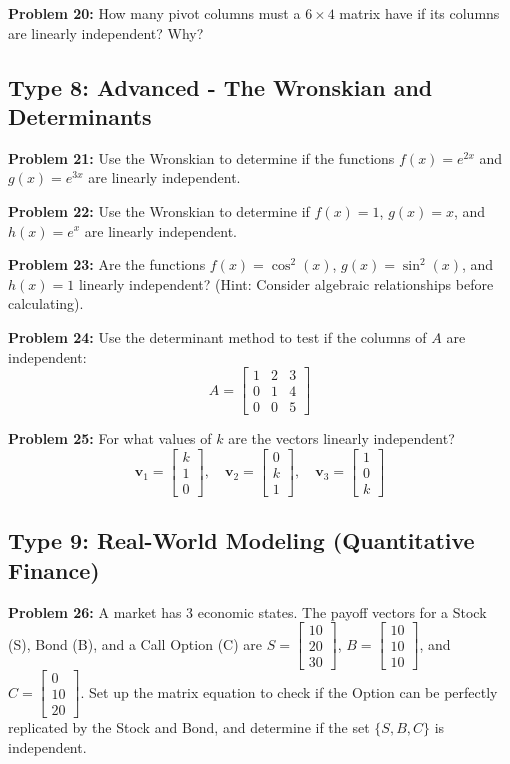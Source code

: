 \documentclass[12pt]{article}
\begin{document}
\textbf{Problem 20:} How many pivot columns must a $6 \times 4$ matrix have if its columns are linearly independent? Why?

\subsection*{Type 8: Advanced - The Wronskian and Determinants}
\textbf{Problem 21:} Use the Wronskian to determine if the functions $f(x) = e^{2x}$ and $g(x) = e^{3x}$ are linearly independent.

\textbf{Problem 22:} Use the Wronskian to determine if $f(x) = 1$, $g(x) = x$, and $h(x) = e^x$ are linearly independent.

\textbf{Problem 23:} Are the functions $f(x) = \cos^2(x)$, $g(x) = \sin^2(x)$, and $h(x) = 1$ linearly independent? (Hint: Consider algebraic relationships before calculating).

\textbf{Problem 24:} Use the determinant method to test if the columns of $A$ are independent:
$$ A = \begin{bmatrix} 1 & 2 & 3 \\ 0 & 1 & 4 \\ 0 & 0 & 5 \end{bmatrix} $$

\textbf{Problem 25:} For what values of $k$ are the vectors linearly independent?
$$ \mathbf{v}_1 = \begin{bmatrix} k \\ 1 \\ 0 \end{bmatrix}, \quad \mathbf{v}_2 = \begin{bmatrix} 0 \\ k \\ 1 \end{bmatrix}, \quad \mathbf{v}_3 = \begin{bmatrix} 1 \\ 0 \\ k \end{bmatrix} $$

\subsection*{Type 9: Real-World Modeling (Quantitative Finance)}
\textbf{Problem 26:} A market has 3 economic states. The payoff vectors for a Stock (S), Bond (B), and a Call Option (C) are $S = \begin{bmatrix} 10 \\ 20 \\ 30 \end{bmatrix}$, $B = \begin{bmatrix} 10 \\ 10 \\ 10 \end{bmatrix}$, and $C = \begin{bmatrix} 0 \\ 10 \\ 20 \end{bmatrix}$. Set up the matrix equation to check if the Option can be perfectly replicated by the Stock and Bond, and determine if the set $\{S, B, C\}$ is independent.
\end{document}
